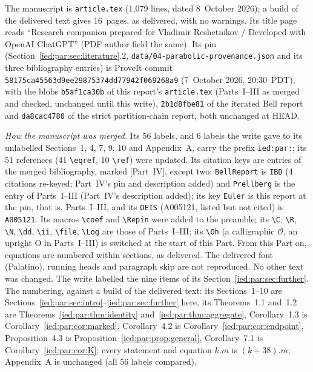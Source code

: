 \documentclass[11pt,letterpaper]{article}
\theoremstyle{remark}\newtheorem{remark}[theorem]{Remark}
\newcommand{\C}{\mathbb C}\newcommand{\R}{\mathbb R}
\newcommand{\N}{\mathbb N}\newcommand{\e}{\mathrm e}
\newcommand{\ii}{\mathrm i}\newcommand{\dd}{\,\mathrm d}
\newcommand{\Oh}{\mathrm O}\newcommand{\supp}{\operatorname{supp}}
\newcommand{\Log}{\operatorname{Log}}
\newcommand{\file}[1]{\nolinkurl{#1}}
\newcommand{\coef}[1]{[z^{#1}]}
\newcommand{\Repin}{\texttt{58175ca45563d9ee29875374dd77942f069268a9}}
\begin{document}
The manuscript is \file{article.tex} (1{,}079 lines, dated 8~October 2026); a
build of the delivered text gives 16~pages, as delivered, with no warnings.
Its title page reads ``Research companion prepared for Vladimir Reshetnikov /
Developed with OpenAI ChatGPT'' (PDF author field the same). Its pin
(Section~\ref{ied:par:sec:literature}.2, \file{data/04-parabolic-provenance.json}
and its three bibliography entries) is ProveIt commit
\file{58175ca45563d9ee29875374dd77942f069268a9} (7~October 2026, 20:30~PDT), with
the blobs \file{b5af1ca30b} of this report's \file{article.tex} (Parts~I--III
as merged and checked, unchanged until this write), \file{2b1d8fbe81} of the
iterated Bell report and \file{da8cac4780} of the strict partition-chain
report, both unchanged at HEAD.

\emph{How the manuscript was merged.} Its 56 labels, and 6 labels the write gave
to its unlabelled Sections~1, 4, 7, 9, 10 and Appendix~A, carry the prefix
\file{ied:par:}; its 51 references (41 \verb|\eqref|, 10 \verb|\ref|) were
updated. Its citation keys are entries of the merged bibliography, marked
[Part~IV], except two: \file{BellReport} is \file{IBD} (4 citations re-keyed;
Part~IV's pin and description added) and \file{Prellberg} is the entry of
Parts~I--III (Part~IV's description added); its key \file{Euler} is this
report at the pin, that is, Parts~I--III, and its \file{OEIS} (A005121, listed
but not cited) is \file{A005121}. Its macros \verb|\coef| and \verb|\Repin| were
added to the preamble; its \verb|\C|, \verb|\R|, \verb|\N|, \verb|\dd|,
\verb|\ii|, \verb|\file|, \verb|\Log| are those of Parts~I--III; its
\verb|\Oh| (a calligraphic $\mathcal O$, an upright $\mathrm O$ in
Parts~I--III) is switched at the start of this Part. From this Part on,
equations are numbered within sections, as delivered. The delivered font
(Palatino), running heads and paragraph skip are not reproduced. No other text
was changed. The write labelled the nine items of its
Section~\ref{ied:par:sec:further}. The numbering, against a build of the
delivered text: its Sections~1--10 are
Sections~\ref{ied:par:sec:intro}--\ref{ied:par:sec:further} here, its
Theorems~1.1 and~1.2 are Theorems~\ref{ied:par:thm:identity}
and~\ref{ied:par:thm:aggregate}, Corollary~1.3 is
Corollary~\ref{ied:par:cor:marked}, Corollary~4.2 is
Corollary~\ref{ied:par:cor:endpoint}, Proposition~4.3 is
Proposition~\ref{ied:par:prop:general}, Corollary~7.1 is
Corollary~\ref{ied:par:cor:K}; every statement and equation $k.m$ is
$(k{+}38).m$; Appendix~A is unchanged (all 56 labels compared).
\end{document}
